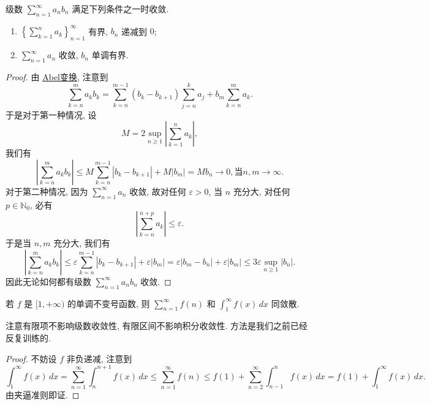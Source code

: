 \documentclass[../../main.tex]{subfiles}
\begin{document}
\begin{theorem}[A-D判别法]
级数 \( \sum_{n=1}^\infty a_n b_n \) 满足下列条件之一时收敛.
\begin{enumerate}
\item \( \left\{ \sum_{k=1}^n a_k \right\}_{n=1}^\infty \) 有界, \( b_n \) 递减到 \( 0 \);

\item \( \sum_{n=1}^\infty a_n \) 收敛, \( b_n \) 单调有界.
\end{enumerate}
\end{theorem}
\begin{proof}
由 \hyperref[theorem:Abel变换]{Abel变换}, 注意到
\[
\sum_{k=n}^m a_k b_k = \sum_{k=n}^{m - 1} (b_k - b_{k + 1}) \sum_{j=n}^k a_j + b_m \sum_{k=n}^m a_k.
\]
于是对于第一种情况, 设
\[
M = 2 \sup_{n \geqslant 1} \left| \sum_{k=1}^n a_k \right|,
\]
我们有
\[
\left| \sum_{k=n}^m a_k b_k \right| \leqslant M \sum_{k=n}^{m - 1} |b_k - b_{k + 1}| + M |b_m| = M b_n \to 0, \text{当} n, m \to \infty.
\]
对于第二种情况, 因为 \( \sum_{n=1}^\infty a_n \) 收敛, 故对任何 \( \varepsilon > 0 \), 当 \( n \) 充分大, 对任何 \( p \in \mathbb{N}_0 \), 必有
\[
\left| \sum_{k=n}^{n + p} a_k \right| \leqslant \varepsilon.
\]
于是当 \( n, m \) 充分大, 我们有
\[
\left| \sum_{k=n}^m a_k b_k \right| \leqslant \varepsilon \sum_{k=n}^{m - 1} |b_k - b_{k + 1}| + \varepsilon |b_m| = \varepsilon |b_m - b_n| + \varepsilon |b_m| \leqslant 3 \varepsilon \sup_{n \geqslant 1} |b_n|.
\]
因此无论如何都有级数 \( \sum_{n=1}^\infty a_n b_n \) 收敛.
\end{proof}

\begin{theorem}[积分判别法]\label{theorem:积分判别法}
若 \( f \) 是 \( [1, +\infty) \) 的单调不变号函数, 则 \( \sum_{n=1}^\infty f(n) \) 和 \( \int_1^\infty f(x) \, dx \) 同敛散.
\end{theorem}
\begin{note}
注意有限项不影响级数收敛性, 有限区间不影响积分收敛性. 方法是我们之前已经反复训练的.
\end{note}
\begin{proof}
不妨设 \( f \) 非负递减, 注意到
\[
\int_1^\infty f(x) \, dx = \sum_{n=1}^\infty \int_n^{n + 1} f(x) \, dx \leqslant \sum_{n=1}^\infty f(n) \leqslant f(1) + \sum_{n=2}^\infty \int_{n - 1}^n f(x) \, dx = f(1) + \int_1^\infty f(x) \, dx.
\]
由夹逼准则即证.
\end{proof}
\end{document}
